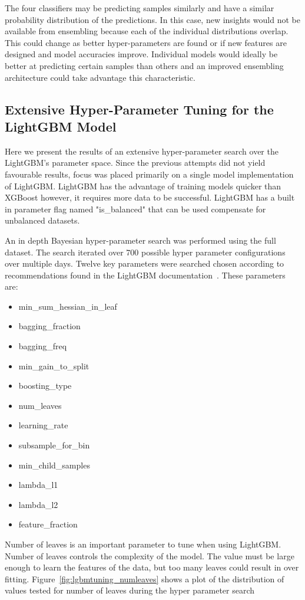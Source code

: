 \documentclass[journal,twoside,web]{ieeecolor}
\begin{document}
The four classifiers may be predicting samples similarly and have a similar probability distribution of the predictions. In this case, new insights would not be available from ensembling because each of the individual distributions overlap. This could change as better hyper-parameters are found or if new features are designed and model accuracies improve. Individual models would ideally be better at predicting certain samples than others and an improved ensembling architecture could take advantage this characteristic.

\subsection{Extensive Hyper-Parameter Tuning for the LightGBM Model}
Here we present the results of an extensive hyper-parameter search over the LightGBM's parameter space. Since the previous attempts did not yield favourable results, focus was placed primarily on a single model implementation of LightGBM. LightGBM has the advantage of training models quicker than XGBoost however, it requires more data to be successful. LightGBM has a built in parameter flag named "is\_balanced" that can be used compensate for unbalanced datasets.

An in depth Bayesian hyper-parameter search was performed using the full dataset. The search iterated over 700 possible hyper parameter configurations over multiple days. Twelve key parameters were searched chosen according to recommendations found in the LightGBM documentation~\cite{lightgbm_documentation}. These parameters are:
\begin{itemize}
\item min\_sum\_hessian\_in\_leaf
\item bagging\_fraction
\item bagging\_freq
\item min\_gain\_to\_split
\item boosting\_type
\item num\_leaves
\item learning\_rate
\item subsample\_for\_bin
\item min\_child\_samples
\item lambda\_l1
\item lambda\_l2
\item feature\_fraction
\end{itemize}

Number of leaves is an important parameter to tune when using LightGBM. Number of leaves controls the complexity of the model. The value must be large enough to learn the features of the data, but too many leaves could result in over fitting. Figure~\ref{fig:lgbmtuning_numleaves} shows a plot of the distribution of values tested for number of leaves during the hyper parameter search
\end{document}
